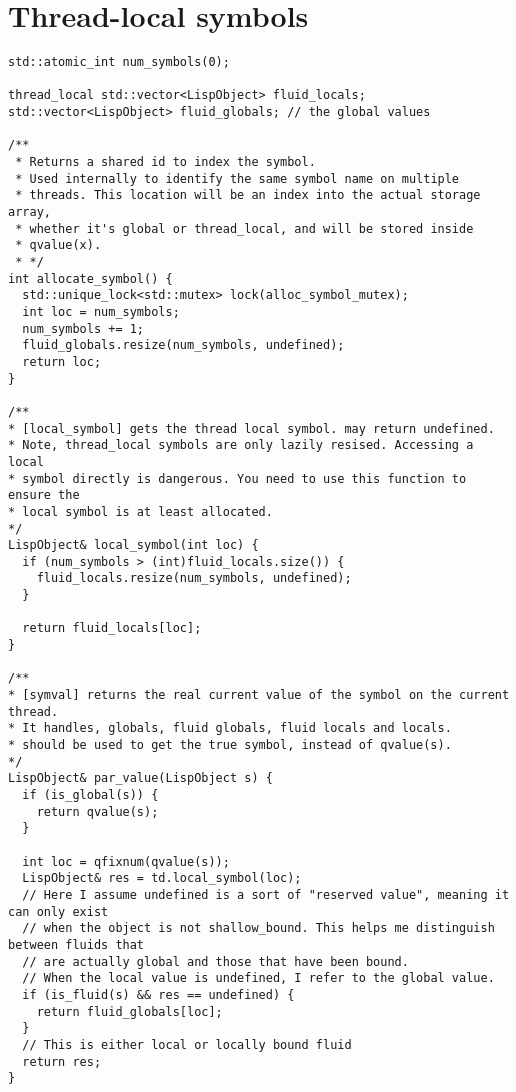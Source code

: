 \section{Thread-local symbols}
\label{sec:threadlocal-code}

\begin{code}
\begin{verbatim}
std::atomic_int num_symbols(0);

thread_local std::vector<LispObject> fluid_locals;
std::vector<LispObject> fluid_globals; // the global values

/**
 * Returns a shared id to index the symbol.
 * Used internally to identify the same symbol name on multiple
 * threads. This location will be an index into the actual storage array,
 * whether it's global or thread_local, and will be stored inside
 * qvalue(x).
 * */
int allocate_symbol() {
  std::unique_lock<std::mutex> lock(alloc_symbol_mutex);
  int loc = num_symbols;
  num_symbols += 1;
  fluid_globals.resize(num_symbols, undefined);
  return loc;
}

/**
* [local_symbol] gets the thread local symbol. may return undefined.
* Note, thread_local symbols are only lazily resised. Accessing a local
* symbol directly is dangerous. You need to use this function to ensure the
* local symbol is at least allocated.
*/
LispObject& local_symbol(int loc) {
  if (num_symbols > (int)fluid_locals.size()) {
    fluid_locals.resize(num_symbols, undefined);
  }

  return fluid_locals[loc];
}

/**
* [symval] returns the real current value of the symbol on the current thread.
* It handles, globals, fluid globals, fluid locals and locals.
* should be used to get the true symbol, instead of qvalue(s).
*/
LispObject& par_value(LispObject s) {
  if (is_global(s)) {
    return qvalue(s);
  }

  int loc = qfixnum(qvalue(s));
  LispObject& res = td.local_symbol(loc);
  // Here I assume undefined is a sort of "reserved value", meaning it can only exist
  // when the object is not shallow_bound. This helps me distinguish between fluids that
  // are actually global and those that have been bound.
  // When the local value is undefined, I refer to the global value.
  if (is_fluid(s) && res == undefined) {
    return fluid_globals[loc];
  }
  // This is either local or locally bound fluid
  return res;
}
\end{verbatim}
\end{code}

